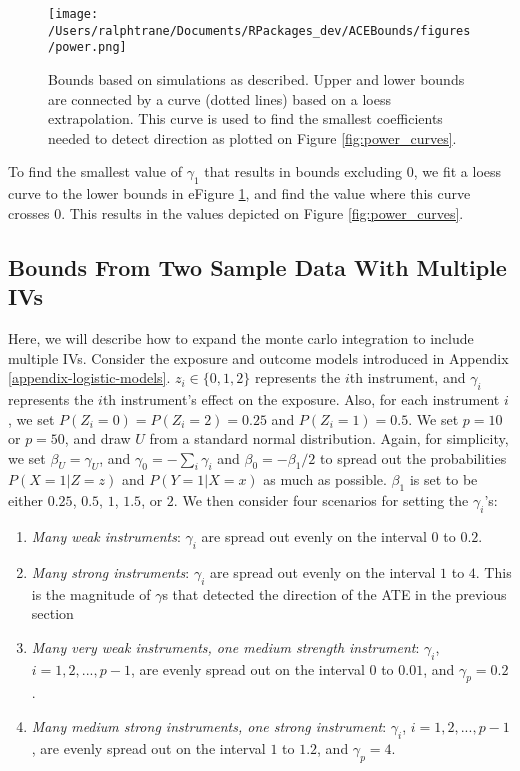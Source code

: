 \documentclass[
]{article}
\theoremstyle{plain}
\begin{document}
\clearpage
\begin{sidewaysfigure}
  \centering
  \texttt{[image: /Users/ralphtrane/Documents/RPackages\_dev/ACEBounds/figures/power.png]}
  \caption{Bounds based on simulations as described. Upper and lower bounds are connected by a curve (dotted lines) based on a loess extrapolation. This curve is used to find the smallest coefficients needed to detect direction as plotted on Figure \ref{fig:power_curves}.}
  \label{fig:power}
\end{sidewaysfigure}
\clearpage

To find the smallest value of \(\gamma_1\) that results in bounds excluding \(0\), we fit a loess curve to the lower bounds in eFigure \ref{fig:power}, and find the value where this curve crosses \(0\). This results in the values depicted on Figure \ref{fig:power_curves}.

\hypertarget{bounds-from-two-sample-data-with-multiple-ivs}{%
\subsection{\texorpdfstring{Bounds From Two Sample Data With Multiple IVs \label{appendix-sim-results-multiple-IVs}}{Bounds From Two Sample Data With Multiple IVs }}\label{bounds-from-two-sample-data-with-multiple-ivs}}

Here, we will describe how to expand the monte carlo integration to include multiple IVs. Consider the exposure and outcome models introduced in Appendix \ref{appendix-logistic-models}. \(z_i \in \{0,1,2\}\) represents the \(i\)th instrument, and \(\gamma_i\) represents the \(i\)th instrument's effect on the exposure. Also, for each instrument \(i\), we set \(P(Z_i = 0) = P(Z_i = 2) = 0.25\) and \(P(Z_i = 1) = 0.5\). We set \(p = 10\) or \(p = 50\), and draw \(U\) from a standard normal distribution. Again, for simplicity, we set \(\beta_U = \gamma_U\), and \(\gamma_0 = -\sum_i \gamma_i\) and \(\beta_0 = -\beta_1/2\) to spread out the probabilities \(P(X = 1 | Z = z)\) and \(P(Y = 1 | X = x)\) as much as possible. \(\beta_1\) is set to be either \(0.25\), \(0.5\), \(1\), \(1.5\), or \(2\). We then consider four scenarios for setting the \(\gamma_i\)'s:

\begin{enumerate}
\item \emph{Many weak instruments}: \(\gamma_i\) are spread out evenly on the interval \(0\) to \(0.2\).
\item \emph{Many strong instruments}: \(\gamma_i\) are spread out evenly on the interval \(1\) to \(4\). This is the magnitude of $\gamma$s that detected the direction of the ATE in the previous section
\item \emph{Many very weak instruments, one medium strength instrument}: $\gamma_i$, $i=1,2,...,p-1$, are evenly spread out on the interval $0$ to $0.01$, and $\gamma_p = 0.2$. 
\item \emph{Many medium strong instruments, one strong instrument}: $\gamma_i$, $i=1,2,...,p-1$, are evenly spread out on the interval $1$ to $1.2$, and $\gamma_p = 4$.
\end{enumerate}
\end{document}
